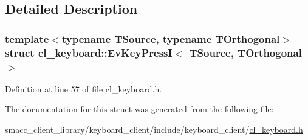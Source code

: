 \subsection{Detailed Description}
\subsubsection*{template$<$typename T\+Source, typename T\+Orthogonal$>$\newline
struct cl\+\_\+keyboard\+::\+Ev\+Key\+Press\+I$<$ T\+Source, T\+Orthogonal $>$}



Definition at line 57 of file cl\+\_\+keyboard.\+h.



The documentation for this struct was generated from the following file\+:\begin{DoxyCompactItemize}
\item 
smacc\+\_\+client\+\_\+library/keyboard\+\_\+client/include/keyboard\+\_\+client/\hyperlink{cl__keyboard_8h}{cl\+\_\+keyboard.\+h}\end{DoxyCompactItemize}
